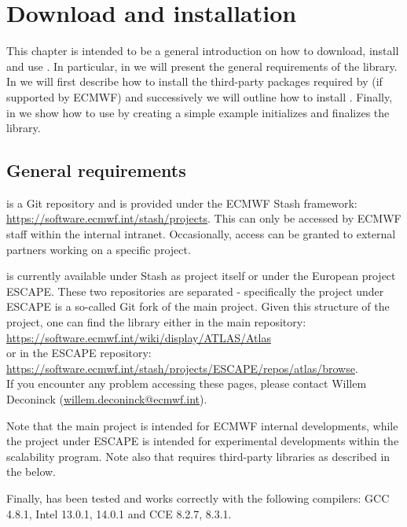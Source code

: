 \chapter{Download and installation}
\label{chap:installation}
This chapter is intended to be a general introduction 
on how to download, install and use \Atlas. In particular, 
in  we will present the general 
requirements of the library. In  we 
will first describe how to install the third-party packages 
required by \Atlas (if supported by ECMWF) and successively 
we will outline how to install \Atlas. Finally, in 
we show how to use \Atlas by creating a simple example 
initializes and finalizes the library.


\section{General requirements}
\label{s:requirements}

\Atlas is a Git repository and is provided under the ECMWF Stash 
framework: \url{https://software.ecmwf.int/stash/projects}. This 
can only be accessed by ECMWF staff within the internal intranet.
Occasionally, access can be granted to external partners working 
on a specific project.

\Atlas is currently available under Stash as \Atlas project 
itself or under the European project ESCAPE. These two repositories 
are separated - specifically the \Atlas project under ESCAPE is 
a so-called Git fork of the main \Atlas project.
Given this structure of the \Atlas project, one can find the 
library either in the main repository:\\
\url{https://software.ecmwf.int/wiki/display/ATLAS/Atlas}\\
or in the ESCAPE repository:\\
\url{https://software.ecmwf.int/stash/projects/ESCAPE/repos/atlas/browse}.\\
If you encounter any problem accessing these pages, please contact 
Willem Deconinck (\url{willem.deconinck@ecmwf.int}).

Note that the main \Atlas project is intended for ECMWF internal 
developments, while the \Atlas project under ESCAPE is intended 
for experimental developments within the scalability program.
Note also that \Atlas requires third-party libraries as described 
in the  below.

Finally, \Atlas has been tested and works correctly with the 
following compilers: GCC 4.8.1, Intel 13.0.1, 14.0.1 and CCE 
8.2.7, 8.3.1.



